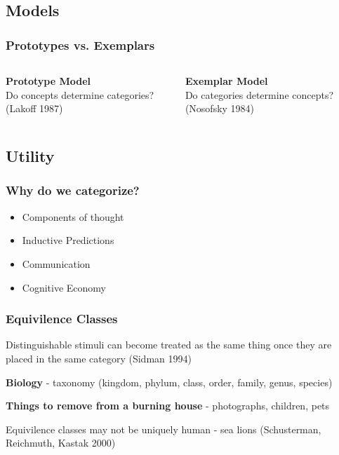 \documentclass{beamer}
\begin{document}
\subsection{Models}
\begin{frame}
\frametitle{Prototypes vs. Exemplars}
\begin{columns}
\begin{column}{.5\textwidth}
\textbf{Prototype Model}\\
Do concepts determine categories? (Lakoff 1987)
\end{column}
\pause
\begin{column}{.5\textwidth}
\textbf{Exemplar Model}\\
Do categories determine concepts? (Nosofsky 1984)
\end{column}
\end{columns}
\end{frame}

\subsection{Utility}
\begin{frame}
\frametitle{Why do we categorize?}
\begin{itemize}
  \item{Components of thought}
  \pause
  \item{Inductive Predictions}
  \pause
  \item{Communication}
  \pause
  \item{Cognitive Economy}
\end{itemize}
\end{frame}

\begin{frame}
\frametitle{Equivilence Classes}
Distinguishable stimuli can become treated as the same thing once they are placed in the same category (Sidman 1994)\\

\bigskip
\pause

\textbf{Biology} - taxonomy (kingdom, phylum, class, order, family, genus, species)\\

\bigskip
\pause

\textbf{Things to remove from a burning house} - photographs, children, pets\\

\bigskip
\pause

Equivilence classes may not be uniquely human - sea lions (Schusterman, Reichmuth, Kastak 2000)
\end{frame}
\end{document}
